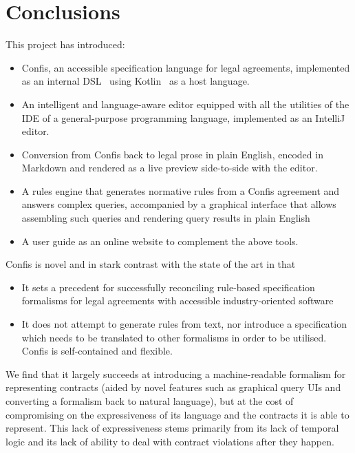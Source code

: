\chapter{Conclusions}\label{ch:conclusions}



This project has introduced:
\begin{itemize}
    \item Confis, an accessible specification language for legal agreements, implemented as an internal DSL~\cite{fowlerDsl} using Kotlin~\cite{kotlinLang} as a host language.
    \item An intelligent and language-aware editor equipped with all the utilities of the IDE of a general-purpose programming language, implemented as an IntelliJ~\cite{intelliJRepo} editor.
    \item Conversion from Confis back to legal prose in plain English, encoded in Markdown and rendered as a live preview side-to-side with the editor.
    \item A rules engine that generates normative rules from a Confis agreement and answers complex queries, accompanied by a graphical interface that allows assembling such queries and rendering query results in plain English
    \item A user guide as an online website to complement the above tools.
\end{itemize}

Confis is novel and in stark contrast with the state of the art in that
\begin{itemize}
    \item It sets a precedent for successfully reconciling rule-based specification formalisms for legal agreements with accessible industry-oriented software
    \item It does not attempt to generate rules from text, nor introduce a specification which needs to be translated to other formalisms in order to be utilised.
    Confis is self-contained and flexible.
\end{itemize}

We find that it largely succeeds at introducing a machine-readable formalism for representing contracts (aided by novel features such as graphical query UIs and converting a formalism back to natural language), but at the cost of compromising on the expressiveness of its language and the contracts it is able to represent.
This lack of expressiveness stems primarily from its lack of temporal logic and its lack of ability to deal with contract violations after they happen.

